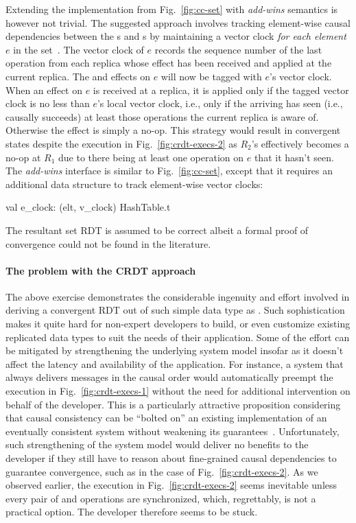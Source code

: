 Extending the  implementation from Fig.~\ref{fig:cc-set} with
\emph{add-wins} semantics is however not trivial. The suggested
approach involves tracking element-wise causal dependencies between
the s and s by maintaining a vector clock \emph{for
each element} $e$ in the set~\cite{zawirski-thesis}. The vector clock
of $e$ records the sequence number of the last  operation
from each replica whose effect has been received and applied at the
current replica. The  and  effects on $e$ will now be
tagged with $e$'s vector clock. When an  effect on $e$ is
received at a replica, it is applied only if the tagged vector clock
is no less than $e$'s local vector clock, i.e., only if the arriving
 has seen (i.e., causally succeeds) at least those
 operations the current replica is aware of.  Otherwise
the effect is simply a no-op. This strategy would result in convergent
states despite the execution in Fig.~\ref{fig:crdt-execs-2} as $R_2$'s
 effectively becomes a no-op at $R_1$ due to there being at
least one  operation on $e$ that it hasn't seen. The
\emph{add-wins}  interface is similar to Fig.~\ref{fig:cc-set},
except that it requires an additional data structure to track
element-wise vector clocks: 
\begin{ocaml}
  val e_clock: (elt, v_clock) HashTable.t
\end{ocaml}
The resultant set RDT is assumed to be correct albeit a formal proof
of convergence could not be found in the literature. 

\noindent\paragraph{The problem with the CRDT approach} The above
exercise demonstrates the considerable ingenuity and effort involved
in deriving a convergent RDT out of such simple data type as .
Such sophistication makes it quite hard for non-expert developers to
build, or even customize existing replicated data types to suit the
needs of their application. Some of the effort can be mitigated by
strengthening the underlying system model insofar as it doesn't affect
the latency and availability of the application. For instance, a
system that always delivers messages in the causal order would
automatically preempt the execution in Fig.~\ref{fig:crdt-execs-1}
without the need for additional intervention on behalf of the
developer. This is a particularly attractive proposition considering
that causal consistency can be ``bolted on'' an existing
implementation of an eventually consistent system without weakening
its guarantees~\cite{bolton}. Unfortunately, such strengthening of the
system model would deliver no benefits to the developer if they still
have to reason about fine-grained causal dependencies to guarantee
convergence, such as in the case of Fig.~\ref{fig:crdt-execs-2}. As we
observed earlier, the execution in Fig.~\ref{fig:crdt-execs-2} seems
inevitable unless every pair of  and  operations are
synchronized, which, regrettably, is not a practical option. The
developer therefore seems to be stuck.

